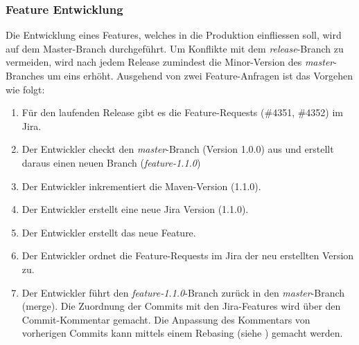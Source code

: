 \subsubsection{Feature Entwicklung}
Die Entwicklung eines Features, welches in die Produktion einfliessen soll, wird auf dem Master-Branch durchgeführt. Um Konflikte mit dem \textit{release}-Branch zu vermeiden, wird nach jedem Release zumindest die Minor-Version des \textit{master}-Branches um eins erhöht.  Ausgehend von zwei Feature-Anfragen ist das Vorgehen wie folgt:
\begin{enumerate}
\item Für den laufenden Release gibt es die Feature-Requests (\#4351, \#4352) im Jira.
\item Der Entwickler checkt den \textit{master}-Branch (Version 1.0.0) aus und erstellt daraus einen neuen Branch (\textit{feature-1.1.0})
\item Der Entwickler inkrementiert die Maven-Version (1.1.0).
\item Der Entwickler erstellt eine neue Jira Version (1.1.0).
\item Der Entwickler erstellt das neue Feature.
\item Der Entwickler ordnet die Feature-Requests im Jira der neu erstellten Version zu.
\item Der Entwickler führt den \textit{feature-1.1.0}-Branch zurück in den \textit{master}-Branch (merge).  Die Zuordnung der Commits mit den Jira-Features wird über den Commit-Kommentar gemacht. Die Anpassung des Kommentars von vorherigen Commits kann mittels einem Rebasing (siehe \cite{dilger201111}) gemacht werden.
\end{enumerate}